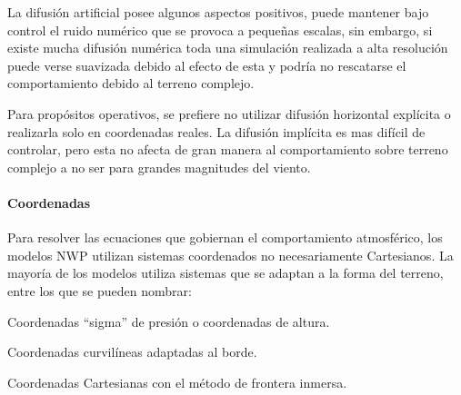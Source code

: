 La difusión artificial posee algunos aspectos positivos, puede mantener bajo control el ruido numérico que se provoca a pequeñas escalas, sin embargo, si existe mucha difusión numérica toda una simulación realizada a alta resolución puede verse suavizada debido al efecto de esta y podría no rescatarse el comportamiento debido al terreno complejo.

Para propósitos operativos, se prefiere no utilizar difusión horizontal explícita o realizarla solo en coordenadas reales. La difusión implícita es mas difícil de controlar, pero esta no afecta de gran manera al comportamiento sobre terreno complejo a no ser para grandes magnitudes del viento. 
\paragraph{Coordenadas} Para resolver las ecuaciones que gobiernan el comportamiento atmosférico, los modelos NWP utilizan sistemas coordenados no necesariamente Cartesianos. La mayoría de los modelos utiliza sistemas que se adaptan a la forma del terreno, entre los que se pueden nombrar:
\begin{itemize*}
	\item Coordenadas ``sigma'' de presión o coordenadas de altura.
	\item Coordenadas curvilíneas adaptadas al borde.
	\item Coordenadas Cartesianas con el método de frontera inmersa.
\end{itemize*}

